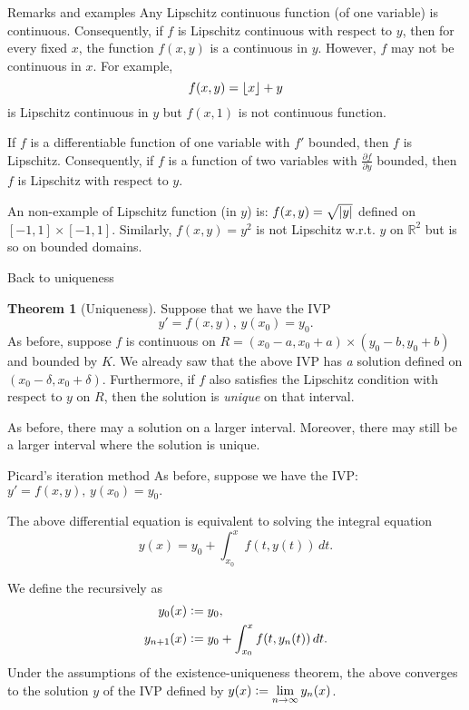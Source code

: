 \documentclass[dvipsnames, handout]{beamer}
\theoremstyle{definition}
\newtheorem{thm}{Theorem}
\begin{document}
\begin{frame}{Remarks and examples}
  Any Lipschitz continuous function (of one variable) is continuous. \pause Consequently, if $f$ is Lipschitz continuous with respect to $y$, then for every fixed $x$, the function $f(x, y)$ is a continuous in $y$. \pause However, $f$ may not be continuous in $x$. \pause For example,
  \begin{equation*} 
    f(x, y) = \left\lfloor x \right\rfloor + y
  \end{equation*}
  is Lipschitz continuous in $y$ but $f(x, 1)$ is not continuous function. \pause

  If $f$ is a differentiable function of one variable with $f'$ bounded, then $f$ is Lipschitz. \pause Consequently, if $f$ is a function of two variables with $\frac{\partial f}{\partial y}$ bounded, then $f$ is Lipschitz with respect to $y$. \pause

  An non-example of Lipschitz function (in $y$) is: $f(x, y) = \sqrt{{\left\lvert y \right\lvert}}$ defined on $[-1, 1] \times [-1, 1]$. \pause Similarly, $f(x, y) = y^{2}$ is not Lipschitz w.r.t. $y$ on $\mathbb{R}^{2}$ but is so on bounded domains.
\end{frame}
\begin{frame}{Back to uniqueness}
  
  \begin{thm}[Uniqueness]
    Suppose that we have the IVP
    \begin{equation*} 
      y' = f(x, y),\, y(x_{0}) = y_{0}.
    \end{equation*} \pause
    As before, suppose $f$ is continuous on $R = (x_{0} - a, x_{0} + a) \times (y_{0} - b, y_{0} + b)$ and bounded by $K$. \pause We already saw that the above IVP has \emph{a} solution defined on $(x_{0} - \delta, x_{0} + \delta)$. \pause Furthermore, if $f$ also satisfies the Lipschitz condition with respect to $y$ on $R$, \pause then the solution is \emph{unique} on that interval.  
  \end{thm} \pause
  As before, there may a solution on a larger interval. \pause Moreover, there may still be a larger interval where the solution is unique.
\end{frame}
\begin{frame}{Picard's iteration method}
  As before, suppose we have the IVP: $y' = f(x, y),\, y(x_{0}) = y_{0}.$ \pause

  The above differential equation is equivalent to solving the integral equation
  \begin{equation*} 
    y(x) = y_{0} + \int_{x_{0}}^{x} f(t, y(t)) \,dt.
  \end{equation*} \pause

  We define the  recursively as \pause
  \begin{align*} 
    y_{0}(x) &\vcentcolon= y_{0}, \\
    y_{n + 1}(x) &\vcentcolon= y_{0} + \int_{x_{0}}^{x} f(t, y_{n}(t)) \,dt.
  \end{align*} \pause
  Under the assumptions of the existence-uniqueness theorem, the above converges to the solution $y$ of the IVP defined by $y(x) \vcentcolon= \displaystyle\lim_{n \to \infty} y_{n}(x)$.
\end{frame}
\end{document}
